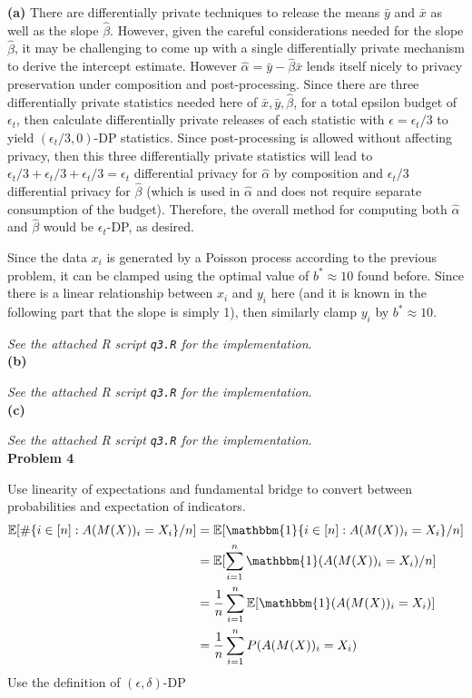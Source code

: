 \documentclass[12pt]{article}
\begin{document}
\textbf{(a)} There are differentially private techniques to release the means $\bar{y}$ and $\bar{x}$ as well as the slope $\hat{\beta}$. However, given the careful considerations needed for the slope $\hat{\beta}$, it may be challenging to come up with a single differentially private mechanism to derive the intercept estimate. However $\hat{\alpha} = \bar{y} - \hat{\beta}\bar{x}$ lends itself nicely to privacy preservation under composition and post-processing. Since there are three differentially private statistics needed here of $\bar{x}, \bar{y}, \hat{\beta}$, for a total epsilon budget of $\epsilon_t$, then calculate differentially private releases of each statistic with $\epsilon = \epsilon_t/3$ to yield $(\epsilon_t / 3,0)$-DP statistics. Since post-processing is allowed without affecting privacy, then this three differentially private statistics will lead to $\epsilon_t / 3 + \epsilon_t / 3 + \epsilon_t / 3 = \epsilon_t$ differential privacy for $\hat{\alpha}$ by composition and $\epsilon_t/3$ differential privacy for $\hat{\beta}$ (which is used in $\hat{\alpha}$ and does not require separate consumption of the budget). Therefore, the overall method for computing both $\hat{\alpha}$ and $\hat{\beta}$ would be $\epsilon_t$-DP, as desired.

Since the data $x_i$ is generated by a Poisson process according to the previous problem, it can be clamped using the optimal value of $b^*\approx 10$ found before. Since there is a linear relationship between $x_i$ and $y_i$ here (and it is known in the following part that the slope is simply 1), then similarly clamp $y_i$ by $b^* \approx 10$.

\emph{See the attached R script \texttt{q3.R} for the implementation}.\\

\textbf{(b)} 

\emph{See the attached R script \texttt{q3.R} for the implementation}.\\

\textbf{(c)} 

\emph{See the attached R script \texttt{q3.R} for the implementation}.\\

{\large\textbf{Problem 4}}

Use linearity of expectations and fundamental bridge to convert between probabilities and expectation of indicators.
\begin{align*}
	\mathbb{E}[\#\{ i\in [n]: A(M(X))_i = X_i\} / n] &= \mathbb{E}[\mathbbm{1}\{ i\in [n]: A(M(X))_i = X_i\} / n]\\
	&= \mathbb{E}[\sum\limits^n_{i=1}\mathbbm{1}(A(M(X))_i = X_i) / n]\\
	&= \dfrac{1}{n}\sum\limits^n_{i=1}\mathbb{E}[\mathbbm{1}(A(M(X))_i = X_i)]\\
	&= \dfrac{1}{n}\sum\limits^n_{i=1}P(A(M(X))_i = X_i)
\end{align*}
Use the definition of $(\epsilon, \delta)$-DP
\end{document}
